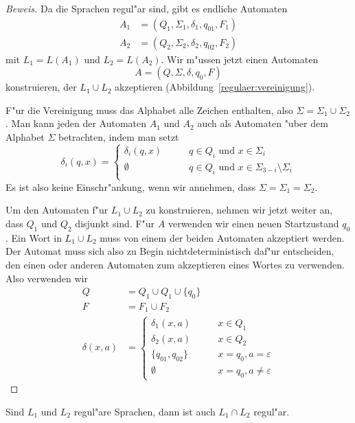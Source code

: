 \begin{proof}[Beweis]
Da die Sprachen regul"ar sind, gibt es endliche Automaten 
\begin{align*}
A_1&=(Q_1,\Sigma_1,\delta_1, q_{01}, F_1)\\
A_2&=(Q_2,\Sigma_2,\delta_2, q_{02}, F_2)
\end{align*}
mit $L_1=L(A_1)$ und $L_2=L(A_2)$. Wir m"ussen
jetzt einen Automaten
\[
A = (Q, \Sigma, \delta, q_0, F)
\]
konstruieren, der $L_1\cup L_2$ akzeptieren
(Abbildung~\ref{regulaer:vereinigung}).

F"ur die Vereinigung muss das Alphabet alle Zeichen enthalten,
also $\Sigma = \Sigma_1\cup\Sigma_2$. Man kann jeden der Automaten 
$A_1$ und $A_2$ auch als Automaten "uber dem Alphabet $\Sigma$
betrachten, indem man setzt
\[
\delta_i(q, x)=\begin{cases}
\delta_i(q,x)&\qquad q\in Q_i\text{ und }  x\in \Sigma_i\\
\emptyset&\qquad q\in Q_i\text{ und } x\in \Sigma_{3-i}\setminus \Sigma_i\\
\end{cases}
\]
Es ist also keine Einschr"ankung, wenn wir annehmen, dass
$\Sigma=\Sigma_1=\Sigma_2$.

Um den Automaten f"ur $L_1\cup L_2$ zu konstruieren, nehmen wir jetzt
weiter an, dass $Q_1$ und $Q_2$ disjunkt sind.
F"ur $A$ verwenden wir einen neuen Startzustand $q_0$.
Ein Wort in $L_1\cup L_2$ muss von einem der beiden Automaten
akzeptiert werden.
Der Automat muss sich also zu Begin nichtdeterministisch
daf"ur entscheiden, den einen oder anderen Automaten zum
akzeptieren eines Wortes zu verwenden.
Also verwenden wir 
\begin{align*}
Q&=Q_1\cup Q_1\cup \{q_0\}\\
F&=F_1\cup F_2\\
\delta(x,a)&=\begin{cases}
\delta_1(x,a)&\qquad x\in Q_1\\
\delta_2(x,a)&\qquad x\in Q_2\\
\{q_{01}, q_{02}\}&\qquad x=q_0, a=\varepsilon\\
\emptyset&\qquad x=q_0, a\ne\varepsilon
\end{cases}
\end{align*}
\end{proof}

\begin{satz}
\label{satz_intersection}
Sind $L_1$ und $L_2$ regul"are Sprachen, dann
ist auch $L_1\cap L_2$ regul"ar.
\end{satz}

